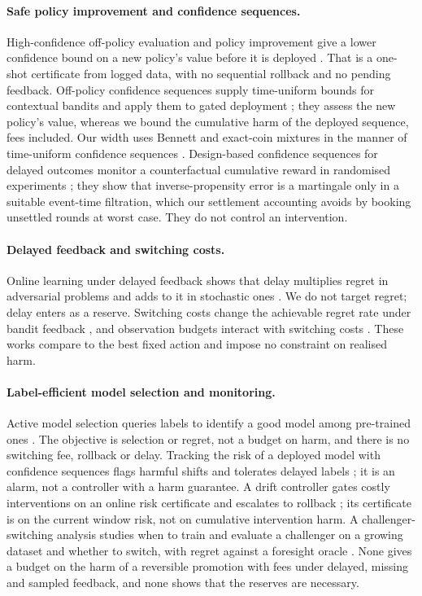 \documentclass{article}
\theoremstyle{plain}
\theoremstyle{definition}
\begin{document}
\paragraph{Safe policy improvement and confidence sequences.}
High-confidence off-policy evaluation and policy improvement give a lower confidence bound on a new policy's value before it is deployed \cite{thomas2015hcope,thomas2015hcpi}. That is a one-shot certificate from logged data, with no sequential rollback and no pending feedback. Off-policy confidence sequences supply time-uniform bounds for contextual bandits and apply them to gated deployment \cite{karampatziakis2021offpolicy}; they assess the new policy's value, whereas we bound the cumulative harm of the deployed sequence, fees included. Our width uses Bennett and exact-coin mixtures in the manner of time-uniform confidence sequences \cite{howard2021time,waudbysmith2024betting}. Design-based confidence sequences for delayed outcomes monitor a counterfactual cumulative reward in randomised experiments \cite{lindon2026design}; they show that inverse-propensity error is a martingale only in a suitable event-time filtration, which our settlement accounting avoids by booking unsettled rounds at worst case. They do not control an intervention.

\paragraph{Delayed feedback and switching costs.}
Online learning under delayed feedback shows that delay multiplies regret in adversarial problems and adds to it in stochastic ones \cite{joulani2013delayed}. We do not target regret; delay enters as a reserve. Switching costs change the achievable regret rate under bandit feedback \cite{cesabianchi2013switching}, and observation budgets interact with switching costs \cite{cheng2023feedback}. These works compare to the best fixed action and impose no constraint on realised harm.

\paragraph{Label-efficient model selection and monitoring.}
Active model selection queries labels to identify a good model among pre-trained ones \cite{karimi2021online,liu2024cams}. The objective is selection or regret, not a budget on harm, and there is no switching fee, rollback or delay. Tracking the risk of a deployed model with confidence sequences flags harmful shifts and tolerates delayed labels \cite{podkopaev2022tracking}; it is an alarm, not a controller with a harm guarantee. A drift controller gates costly interventions on an online risk certificate and escalates to rollback \cite{lamaakal2026drift2act}; its certificate is on the current window risk, not on cumulative intervention harm. A challenger-switching analysis studies when to train and evaluate a challenger on a growing dataset and whether to switch, with regret against a foresight oracle \cite{digalakis2025challenger}. None gives a budget on the harm of a reversible promotion with fees under delayed, missing and sampled feedback, and none shows that the reserves are necessary.
\end{document}

